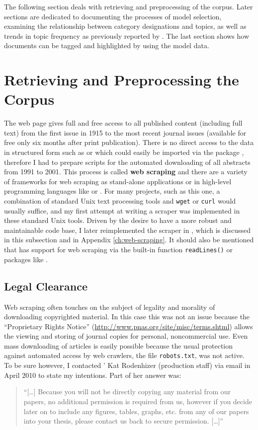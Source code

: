 The following section deals with retrieving and preprocessing of the  corpus. Later sections are dedicated to documenting the processes of model selection, examining the relationship between category designations and topics, as well as trends in topic frequency as previously reported by . The last section shows how documents can be tagged and highlighted by using the model data.


\section{Retrieving and Preprocessing the Corpus}

The  web page gives full and free access to all published content (including full text) from the first issue in 1915 to the most recent journal issues (available for free only six months after print publication). There is no direct access to the data in structured form such as  or  which could easily be imported via the  package , therefore I had to prepare scripts for the automated downloading of all abstracts from 1991 to 2001. This process is called \textbf{web scraping} and there are a variety of frameworks for web scraping as stand-alone applications or in high-level programming languages like  or . For many projects, such as this one, a combination of standard Unix text processing tools and \texttt{wget} or \texttt{curl} would usually suffice, and my first attempt at writing a scraper was implemented in these standard Unix tools. Driven by the desire to have a more robust and maintainable code base, I later reimplemented the scraper in , which is discussed in this subsection and in Appendix \ref{ch:web-scraping}.
It should also be mentioned that  has support for web scraping via the built-in function \texttt{readLines()} or packages like  \citep{TempleLang2010}.

\subsection{Legal Clearance}
Web scraping often touches on the subject of legality and morality of downloading copyrighted material. In this case this was not an issue because the ``Proprietary Rights Notice'' (\url{http://www.pnas.org/site/misc/terms.shtml}) allows the viewing and storing of journal copies for personal, noncommercial use. Even mass downloading of articles is easily possible because the usual protection against automated access by web crawlers, the file \texttt{robots.txt}, was not active. To be sure however, I contacted ' Kat Rodenhizer (production staff) via email in April 2010 to state my intentions. Part of her answer was: 
\begin{quote}
``[\dots] Because you will not be directly copying any material from our papers, no additional permission is required from us,  however if you decide later on to include any figures, tables, graphs, etc. from any of our papers into your thesis, please contact us back to secure permission. [\dots]''
\end{quote} 


